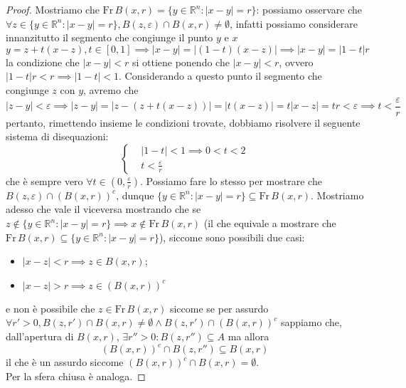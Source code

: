 \begin{proof}
	Mostriamo che $\text{Fr} \, B(x, r) = \{y \in \mathbb{R}^n : |x-y| = r \}$: %
	possiamo osservare che $\forall z \in \{y \in \mathbb{R}^n : |x-y| = r \}, B(z, \varepsilon) \cap B(x, r) \neq \emptyset$, infatti possiamo considerare innanzitutto il segmento che congiunge il punto $y$ e $x$
	$$
	y = z + t(x-z), t \in [0, 1] \implies |x-y| = |(1-t)(x-z)| \implies |x-y| = |1-t|r
	$$
	la condizione che $|x-y|<r$ si ottiene ponendo che $|x-y| < r$, ovvero $|1-t| r < r \implies |1-t| < 1$. Considerando a questo punto il segmento che congiunge $z$ con $y$, avremo che
	$$
	|z-y| < \varepsilon \implies |z-y| = |z-(z+t(x-z))| = |t(x-z)| = t|x-z| = tr < \varepsilon \implies t < \frac{\varepsilon}{r} 
	$$
	pertanto, rimettendo insieme le condizioni trovate, dobbiamo risolvere il seguente sistema di disequazioni:
	\begin{equation*}
		\begin{cases}
			&|1-t| < 1 \implies 0 < t < 2 \\
			&t < \frac{\varepsilon}{r}
		\end{cases}
	\end{equation*}
	che è sempre vero $\forall t \in (0, \frac{\varepsilon}{r})$. Possiamo fare lo stesso per mostrare che $B(z, \varepsilon) \cap (B(x, r))^c$, dunque $\{y \in \mathbb{R}^n: |x-y| = r \} \subseteq \text{Fr} \, B(x, r)$. Mostriamo adesso che vale il viceversa mostrando che 
	se $z \not\in \{y \in \mathbb{R}^n : |x-y| = r \} \implies x \not\in \text{Fr} \, B(x, r)$ (il che equivale a mostrare che $\text{Fr} \, B(x,r) \subseteq \{y \in \mathbb{R}^n : |x-y| = r \}$), siccome sono possibili due casi:
	\begin{itemize}
		\item $|x-z| < r \implies z \in B(x, r)$;
		\item $|x-z| > r \implies z \in (B(x, r))^c$
	\end{itemize}
	e non è possibile che $z \in \text{Fr} \, B(x, r)$ siccome se per assurdo $\forall r' > 0, B(z, r') \cap B(x, r) \neq \emptyset \wedge B(z, r') \cap (B(x, r))^c$ sappiamo che, dall'apertura di $B(x, r)$, $\exists r'' > 0: B(z, r'') \subseteq A$ ma allora
	$$
	(B(x, r))^c \cap B(z, r'') \subseteq B(x, r)
	$$
	il che è un assurdo siccome $(B(x,r))^c \cap B(x, r) = \emptyset$. \\
	Per la sfera chiusa è analoga.
\end{proof}
